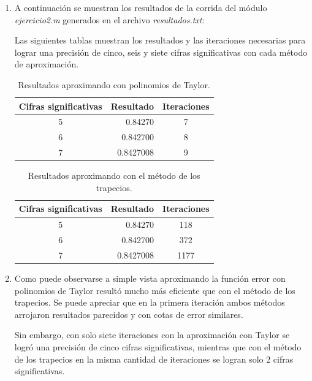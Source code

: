 \documentclass[titlepage,a4paper]{article}
\begin{document}
\begin{enumerate}[label=(\alph*)]
		\item
			A continuación se muestran los resultados de la corrida del módulo \emph{ejercicio2.m} generados en el archivo \emph{resultados.txt}:
			

			Las siguientes tablas muestran los resultados y las iteraciones necesarias para lograr una precisión de cinco, seis y 
			siete cifras significativas con cada método de aproximación.

				\begin{table}[H]
					\begin{center}
						\begin{tabular}{ | c | r | c | }
						\hline
						Cifras significativas & Resultado & Iteraciones \\ \hline
						5 & 0.84270 & 7 \\ \hline
						6 & 0.842700 & 8 \\ \hline
						7 & 0.8427008 & 9 \\
						\hline
						\end{tabular}
						\caption{Resultados aproximando con polinomios de Taylor.}
					\end{center}
				\end{table}


				\begin{table}[H]
					\begin{center}
						\begin{tabular}{ | c | r | c | }
						\hline
						Cifras significativas & Resultado & Iteraciones \\ \hline
						5 & 0.84270 & 118 \\ \hline
						6 & 0.842700 & 372 \\ \hline
						7 & 0.8427008 & 1177 \\
						\hline
						\end{tabular}
						\caption{Resultados aproximando con el método de los trapecios.}
					\end{center}
				\end{table}

		\item
			Como puede observarse a simple vista aproximando la función error con polinomios de Taylor resultó mucho
			más eficiente que con el método de los trapecios.
			Se puede apreciar que en la primera iteración ambos métodos arrojaron resultados parecidos y con cotas de error 
			similares.

			Sin embargo, con solo siete iteraciones con la aproximación con Taylor se logró una precisión de 
			cinco cifras significativas, mientras que con el método de los trapecios en la misma cantidad de 
			iteraciones se logran solo 2 cifras significativas. 
			

\end{enumerate}
\end{document}
